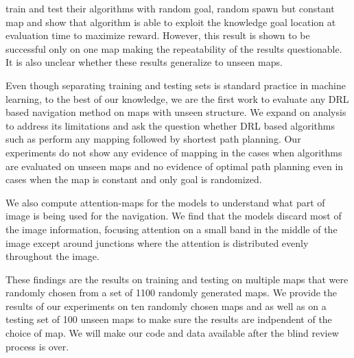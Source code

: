 \cite{MiPaViICLR2017} train and test their algorithms with random goal, random spawn but constant map and show that algorithm is able to exploit the knowledge goal location at evaluation time to maximize reward.
However, this result is shown to be successful only on one map making the repeatability of the results questionable.
It is also unclear whether these results generalize to unseen maps.

Even though separating training and testing sets is standard practice in machine learning, to the best of our knowledge, we are the first work to evaluate any DRL based navigation method on maps with unseen structure.
We expand on \cite{MiPaViICLR2017} analysis to address its limitations and ask the question whether DRL based algorithms such as \NavAiiiCDiDiiL{} perform any mapping followed by shortest path planning.
Our experiments do not show any evidence of mapping in the cases when algorithms are evaluated on unseen maps and no evidence of optimal path planning even in cases when the map is constant and only goal is randomized.

We also compute attention-maps for the models to understand what part of image is being used for the navigation.
We find that the models discard most of the image information, focusing attention on a small band in the middle of the image except around junctions where the attention is distributed evenly throughout the image.

These findings are the results on training and testing on multiple maps that were randomly chosen from a set of 1100 randomly generated maps.
We provide the results of our experiments on ten randomly chosen maps and as well as on a testing set of 100 unseen maps to make sure the results are indpendent of the choice of map.
We will make our code and data available after the blind review process is over.




